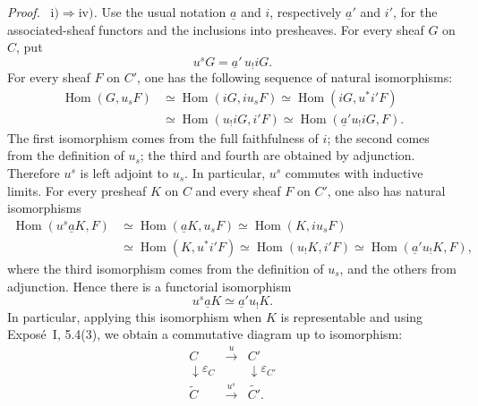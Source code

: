 \documentclass[11pt]{article}
\newcommand{\Hom}{\operatorname{Hom}}
\newenvironment{prooftext}{\par\noindent\emph{Proof.}\ }{\par\medskip}
\begin{document}
\begin{prooftext}
\medskip\noindent
\emph{\(\mathrm{i)}\Rightarrow\mathrm{iv)}\).} Use the usual notation \(\underline a\) and \(i\), respectively \(\underline a'\) and \(i'\), for the associated-sheaf functors and the inclusions into presheaves. For every sheaf \(G\) on \(C\), put
\[
u^sG=\underline a'\,u_!iG.
\]
For every sheaf \(F\) on \(C'\), one has the following sequence of natural isomorphisms:
\begin{align*}
\Hom(G,u_sF)&\simeq \Hom(iG,iu_sF)
             \simeq \Hom(iG,u^*i'F)\\
            &\simeq \Hom(u_!iG,i'F)
             \simeq \Hom(\underline a' u_!iG,F).
\end{align*}
The first isomorphism comes from the full faithfulness of \(i\); the second comes from the definition of \(u_s\); the third and fourth are obtained by adjunction. Therefore \(u^s\) is left adjoint to \(u_s\). In particular, \(u^s\) commutes with inductive limits. For every presheaf \(K\) on \(C\) and every sheaf \(F\) on \(C'\), one also has natural isomorphisms
\begin{align*}
\Hom(u^s\underline a K,F)&\simeq\Hom(\underline aK,u_sF)
\simeq\Hom(K,iu_sF)\\
&\simeq\Hom(K,u^*i'F)
\simeq\Hom(u_!K,i'F)
\simeq\Hom(\underline a'u_!K,F),
\end{align*}
where the third isomorphism comes from the definition of \(u_s\), and the others from adjunction. Hence there is a functorial isomorphism
\[
u^s\underline aK\simeq\underline a'u_!K.
\]
In particular, applying this isomorphism when \(K\) is representable and using Expos\'e~I, 5.4(3), we obtain a commutative diagram up to isomorphism:
\[
\begin{array}{ccc}
C&\xrightarrow{\ u\ }&C'\\
\downarrow{\scriptstyle\varepsilon_C}&&\downarrow{\scriptstyle\varepsilon_{C'}}\\
\widetilde C&\xrightarrow{\ u^s\ }&\widetilde {C'}.
\end{array}
\]


\end{prooftext}
\end{document}
